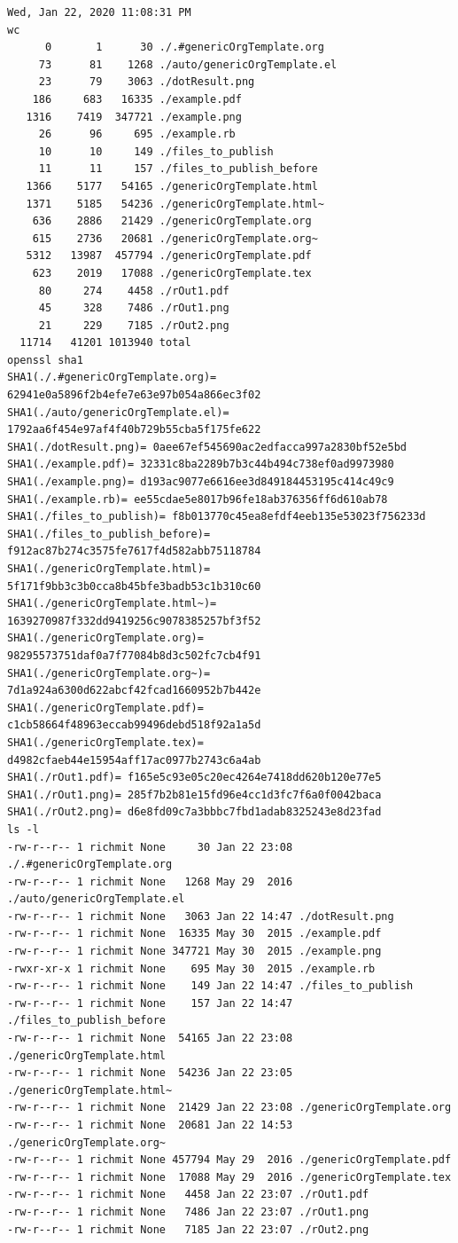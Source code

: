\documentclass[11pt]{article}
\begin{document}
\begin{verbatim}
Wed, Jan 22, 2020 11:08:31 PM
wc
      0       1      30 ./.#genericOrgTemplate.org
     73      81    1268 ./auto/genericOrgTemplate.el
     23      79    3063 ./dotResult.png
    186     683   16335 ./example.pdf
   1316    7419  347721 ./example.png
     26      96     695 ./example.rb
     10      10     149 ./files_to_publish
     11      11     157 ./files_to_publish_before
   1366    5177   54165 ./genericOrgTemplate.html
   1371    5185   54236 ./genericOrgTemplate.html~
    636    2886   21429 ./genericOrgTemplate.org
    615    2736   20681 ./genericOrgTemplate.org~
   5312   13987  457794 ./genericOrgTemplate.pdf
    623    2019   17088 ./genericOrgTemplate.tex
     80     274    4458 ./rOut1.pdf
     45     328    7486 ./rOut1.png
     21     229    7185 ./rOut2.png
  11714   41201 1013940 total
openssl sha1
SHA1(./.#genericOrgTemplate.org)= 62941e0a5896f2b4efe7e63e97b054a866ec3f02
SHA1(./auto/genericOrgTemplate.el)= 1792aa6f454e97af4f40b729b55cba5f175fe622
SHA1(./dotResult.png)= 0aee67ef545690ac2edfacca997a2830bf52e5bd
SHA1(./example.pdf)= 32331c8ba2289b7b3c44b494c738ef0ad9973980
SHA1(./example.png)= d193ac9077e6616ee3d849184453195c414c49c9
SHA1(./example.rb)= ee55cdae5e8017b96fe18ab376356ff6d610ab78
SHA1(./files_to_publish)= f8b013770c45ea8efdf4eeb135e53023f756233d
SHA1(./files_to_publish_before)= f912ac87b274c3575fe7617f4d582abb75118784
SHA1(./genericOrgTemplate.html)= 5f171f9bb3c3b0cca8b45bfe3badb53c1b310c60
SHA1(./genericOrgTemplate.html~)= 1639270987f332dd9419256c9078385257bf3f52
SHA1(./genericOrgTemplate.org)= 98295573751daf0a7f77084b8d3c502fc7cb4f91
SHA1(./genericOrgTemplate.org~)= 7d1a924a6300d622abcf42fcad1660952b7b442e
SHA1(./genericOrgTemplate.pdf)= c1cb58664f48963eccab99496debd518f92a1a5d
SHA1(./genericOrgTemplate.tex)= d4982cfaeb44e15954aff17ac0977b2743c6a4ab
SHA1(./rOut1.pdf)= f165e5c93e05c20ec4264e7418dd620b120e77e5
SHA1(./rOut1.png)= 285f7b2b81e15fd96e4cc1d3fc7f6a0f0042baca
SHA1(./rOut2.png)= d6e8fd09c7a3bbbc7fbd1adab8325243e8d23fad
ls -l
-rw-r--r-- 1 richmit None     30 Jan 22 23:08 ./.#genericOrgTemplate.org
-rw-r--r-- 1 richmit None   1268 May 29  2016 ./auto/genericOrgTemplate.el
-rw-r--r-- 1 richmit None   3063 Jan 22 14:47 ./dotResult.png
-rw-r--r-- 1 richmit None  16335 May 30  2015 ./example.pdf
-rw-r--r-- 1 richmit None 347721 May 30  2015 ./example.png
-rwxr-xr-x 1 richmit None    695 May 30  2015 ./example.rb
-rw-r--r-- 1 richmit None    149 Jan 22 14:47 ./files_to_publish
-rw-r--r-- 1 richmit None    157 Jan 22 14:47 ./files_to_publish_before
-rw-r--r-- 1 richmit None  54165 Jan 22 23:08 ./genericOrgTemplate.html
-rw-r--r-- 1 richmit None  54236 Jan 22 23:05 ./genericOrgTemplate.html~
-rw-r--r-- 1 richmit None  21429 Jan 22 23:08 ./genericOrgTemplate.org
-rw-r--r-- 1 richmit None  20681 Jan 22 14:53 ./genericOrgTemplate.org~
-rw-r--r-- 1 richmit None 457794 May 29  2016 ./genericOrgTemplate.pdf
-rw-r--r-- 1 richmit None  17088 May 29  2016 ./genericOrgTemplate.tex
-rw-r--r-- 1 richmit None   4458 Jan 22 23:07 ./rOut1.pdf
-rw-r--r-- 1 richmit None   7486 Jan 22 23:07 ./rOut1.png
-rw-r--r-- 1 richmit None   7185 Jan 22 23:07 ./rOut2.png
\end{verbatim}
\end{document}
